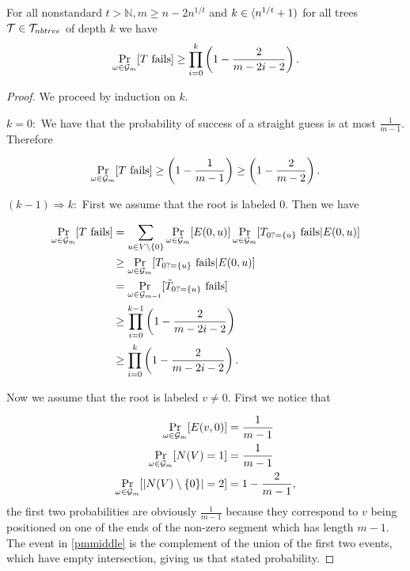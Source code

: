 \begin{lemm}\label{lemmpPATHlowerbound}
For all nonstandard $t>\mathbb{N},m\geq n-2n^{1/t}$ and $k\in \langle n^{1/t}+1)$ for all trees $\mathcal{T}\in \mathcal{T}_{nbtree}$ of depth $k$ we have
\[
\Pr_{\omega\in\mathcal{G}_m}[\text{$T$ fails}]\geq \prod_{i=0}^k\left (1-\frac{2}{m-2i-2}\right ).
\]
\end{lemm}
\begin{proof}
We proceed by induction on $k$. 

$k=0:$ We have that the probability of success of a straight guess is at most $\frac{1}{m-1}$. Therefore

\begin{align}
\Pr_{\omega\in\mathcal{G}_m}[\text{$T$ fails}]\geq \left (1-\frac{1}{m-1}\right ) \geq \left(1-\frac{2}{m-2}\right).
\end{align}

$(k-1) \Rightarrow k:$ First we assume that the root is labeled $0$. Then we have 

\begin{align}
\Pr_{\omega\in\mathcal{G}_m}[\text{$T$ fails}]&=\sum_{u\in V\setminus\{0\}}\Pr_{\omega\in\mathcal{G}_{m}}[E(0,u)]\Pr_{\omega\in\mathcal{G}_{m}}[T_{0?=\{u\}}\text{ fails}|E(0,u)]\\
&\geq \Pr_{\omega\in\mathcal{G}_{m}}[T_{0?=\{u\}}\text{ fails}|E(0,u)]\\
&= \Pr_{\omega\in\mathcal{G}_{m-1}}[\tilde T_{0?=\{u\}}\text{ fails}]\\
&\geq \prod_{i=0}^{k-1}\left(1-\frac{2}{m-2i-2}\right)\\
&\geq \prod_{i=0}^{k}\left(1-\frac{2}{m-2i-2}\right).
\end{align}

Now we assume that the root is labeled $v\not= 0$. First we notice that

\begin{align}
\Pr_{\omega\in\mathcal{G}_m}[E(v,0)]&=\frac{1}{m-1}\\
\Pr_{\omega\in\mathcal{G}_m}[N(V)=1]&=\frac{1}{m-1}\\
\Pr_{\omega\in\mathcal{G}_m}[\left|{N(V)\setminus\{0\}}\right|=2]&=1-\frac{2}{m-1},\label{pmmiddle}
\end{align}
the first two probabilities are obviously $\frac{1}{m-1}$ because they correspond to $v$ being positioned on one of the ends of the non-zero segment which has length $m-1$. The event in \eqref{pmmiddle} is the complement of the union of the first two events, which have empty intersection, giving us that stated probability.


\end{proof}
